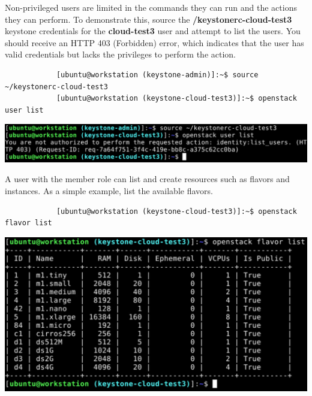\documentclass[letterpaper, 12pt]{article}
\begin{document}
\begin{enumerate}
    \begin{labstep}
        Non-privileged users are limited in the commands they can run and the actions they can perform.
        To demonstrate this, source the \textbf{\texttildemid/keystonerc-cloud-test3} keystone credentials for the \textbf{cloud-test3} user and attempt to list the users.
        You should receive an HTTP 403 (Forbidden) error, which indicates that the user has valid credentials but lacks the privileges to perform the action.
        \begin{lstlisting}
            [ubuntu@workstation (keystone-admin)]:~$ source ~/keystonerc-cloud-test3
            [ubuntu@workstation (keystone-cloud-test3)]:~$ openstack user list
        \end{lstlisting}

        \begin{center}
            \includegraphics[width=\linewidth]{images/part4/step13.png}
        \end{center}
    \end{labstep}

    \begin{labstep}
        A user with the member role can list and create resources such as flavors and instances.
        As a simple example, list the available flavors.
        \begin{lstlisting}
            [ubuntu@workstation (keystone-cloud-test3)]:~$ openstack flavor list
        \end{lstlisting}

        \begin{center}
            \includegraphics[width=\linewidth]{images/part4/step14.png}
        \end{center}
    \end{labstep}


\end{enumerate}
\end{document}
